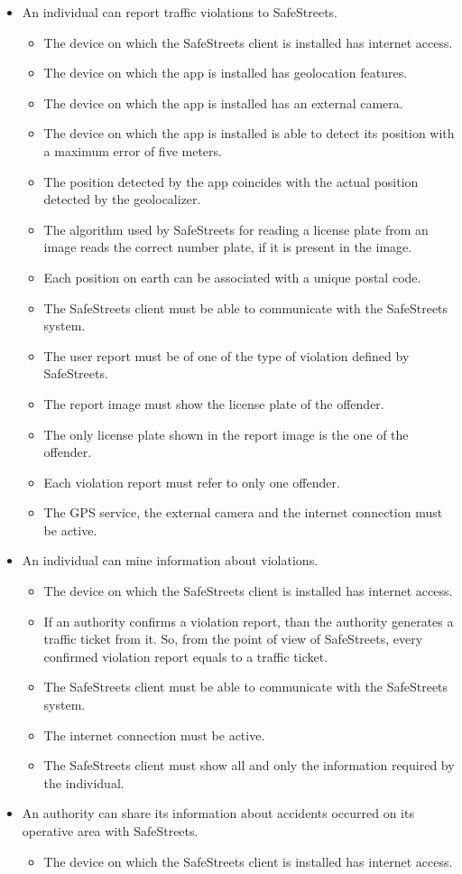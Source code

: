 \documentclass{article}
\newcommand\goal[1]{\item[{[G#1]}] }
\newcommand\requirement[1]{\item[{[R#1]}] }
\newcommand\assumption[1]{\item[{[A#1]}] }
\begin{document}
			\begin{itemize}
				\goal{1}An individual can report traffic violations to SafeStreets.
				\begin{itemize}
					\assumption{1} The device on which the SafeStreets client is installed has internet access.
					\assumption{2} The device on which the app is installed has geolocation features.
					\assumption{3} The device on which the app is installed has an external camera.
					\assumption{4} The device on which the app is installed is able to detect its position with a maximum error of five meters.
					\assumption{5} The position detected by the app coincides with the actual position detected by the geolocalizer.
					\assumption{6} The algorithm used by SafeStreets for reading a license plate from an image reads the correct number plate, if it is present in the image.
					\assumption{8} Each position on earth can be associated with a unique postal code.
					\requirement{1} The SafeStreets client must be able to communicate with the SafeStreets system.
					\requirement{2} The user report must be of one of the type of violation defined by SafeStreets.
					\requirement{3} The report image must show the license plate of the offender.
					\requirement{4} The only license plate shown in the report image is the one of the offender.
					\requirement{5} Each violation report must refer to only one offender.	
					\requirement{6} The GPS service, the external camera and the internet connection must be active.
				\end{itemize}
				\goal{2}An individual can mine information about violations.
				\begin{itemize}
					\assumption{1} The device on which the SafeStreets client is installed has internet access.
					\assumption{9} If an authority confirms a violation report, than the authority generates a traffic ticket from it. So, from the point of view of 				SafeStreets, every confirmed violation report equals to a traffic ticket.
					\requirement{1} The SafeStreets client must be able to communicate with the SafeStreets system.
					\requirement{2} The internet connection must be active.
					\requirement{3} The SafeStreets client must show all and only the information required by the individual.
				\end{itemize}					
				\goal{3}An authority can share its information about accidents occurred on its operative area with SafeStreets.
				\begin{itemize}
					\assumption{1} The device on which the SafeStreets client is installed has internet access.

\end{itemize}
\end{itemize}
\end{document}
